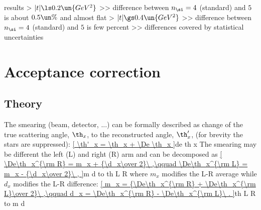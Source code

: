 \> results
\>> $|t| \ls 0.2\un{GeV^2}$
\>>> difference between $n_\si = 4$ (standard) and $5$ is about $0.5\un{\%}$ and almost flat
\>> $|t| \gs 0.4\un{GeV^2}$
\>>> difference between $n_\si = 4$ (standard) and $5$ is few percent
\>>> differences covered by statistical uncertainties


\section{Acceptance correction}

\subsection{Theory}

\vskip3mm

The smearing (beam, detector, ...) can be formally described as change of the true scattering angle, $\th_x$, to the reconstructed angle, $\th'_x$, (for brevity the stars are suppressed):
\eqref{
\th'_x = \th_x + \De \th_x
}{de th x}
The smearing may be different the left (L) and right (R) arm and can be decomposed as
\eqref{
\De\th_x^{\rm R} = m_x + {\d_x\over 2}\ ,\qquad \De\th_x^{\rm L} = m_x - {\d_x\over 2}\ ,
}{m d to th L R}
where $m_x$ modifies the L-R average while $d_x$ modifies the L-R difference:
\eqref{
m_x = {\De\th_x^{\rm R} + \De\th_x^{\rm L}\over 2}\ ,\qquad d_x = \De\th_x^{\rm R} - \De\th_x^{\rm L}\ .
}{th L R to m d}

